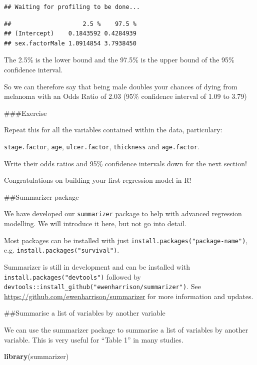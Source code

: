 \documentclass[]{book}
\makeatletter
\newenvironment{Shaded}{\begin{snugshade}}{\end{snugshade}}
\newcommand{\KeywordTok}[1]{\textcolor[rgb]{0.13,0.29,0.53}{\textbf{#1}}}
\newcommand{\NormalTok}[1]{#1}
\newenvironment{kframe}{%
\medskip{}
\setlength{\fboxsep}{.8em}
 \def\at@end@of@kframe{}%
 \ifinner\ifhmode%
  \def\at@end@of@kframe{\end{minipage}}%
  \begin{minipage}{\columnwidth}%
 \fi\fi%
 \def\FrameCommand##1{\hskip\@totalleftmargin \hskip-\fboxsep
 \colorbox{shadecolor}{##1}\hskip-\fboxsep
     \hskip-\linewidth \hskip-\@totalleftmargin \hskip\columnwidth}%
 \MakeFramed {\advance\hsize-\width
   \@totalleftmargin\z@ \linewidth\hsize
   \@setminipage}}%
 {\par\unskip\endMakeFramed%
 \at@end@of@kframe}
\renewenvironment{Shaded}{\begin{kframe}}{\end{kframe}}
\theoremstyle{definition}
\theoremstyle{definition}
\theoremstyle{definition}
\theoremstyle{remark}
\makeatother
\begin{document}
\begin{verbatim}
## Waiting for profiling to be done...
\end{verbatim}

\begin{verbatim}
##                    2.5 %    97.5 %
## (Intercept)    0.1843592 0.4284939
## sex.factorMale 1.0914854 3.7938450
\end{verbatim}

The 2.5\% is the lower bound and the 97.5\% is the upper bound of the
95\% confidence interval.

So we can therefore say that being male doubles your chances of dying
from melanoma with an Odds Ratio of 2.03 (95\% confidence interval of
1.09 to 3.79)

\#\#\#Exercise

Repeat this for all the variables contained within the data,
particulary:

\texttt{stage.factor}, \texttt{age}, \texttt{ulcer.factor},
\texttt{thickness} and \texttt{age.factor}.

Write their odds ratios and 95\% confidence intervals down for the next
section!

Congratulations on building your first regression model in R!

\#\#Summarizer package

We have developed our \texttt{summarizer} package to help with advanced
regression modelling. We will introduce it here, but not go into detail.

Most packages can be installed with just
\texttt{install.packages("package-name")}, e.g.
\texttt{install.packages("survival")}.

Summarizer is still in development and can be installed with
\texttt{install.packages("devtools")} followed by
\texttt{devtools::install\_github("ewenharrison/summarizer")}. See
\url{https://github.com/ewenharrison/summarizer} for more information
and updates.

\#\#Summarise a list of variables by another variable

We can use the summarizer package to summarise a list of variables by
another variable. This is very useful for ``Table 1'' in many studies.

\begin{Shaded}
\begin{Highlighting}[]
\KeywordTok{library}\NormalTok{(summarizer)}
\end{Highlighting}
\end{Shaded}
\end{document}
